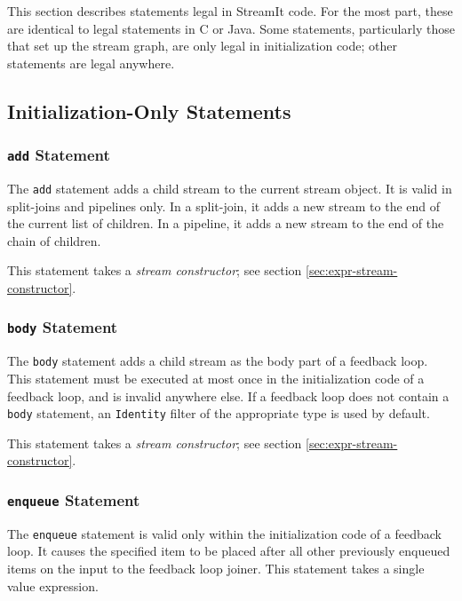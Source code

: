 \documentclass[11pt]{article}
\begin{document}
This section describes statements legal in StreamIt code.  For the
most part, these are identical to legal statements in C or Java.  Some
statements, particularly those that set up the stream graph, are only
legal in initialization code; other statements are legal anywhere.

\subsection{Initialization-Only Statements}

\subsubsection{\lstinline|add| Statement}

The \lstinline|add| statement adds a child stream to the current stream
object.  It is valid in split-joins and pipelines only.  In a
split-join, it adds a new stream to the end of the current list of
children.  In a pipeline, it adds a new stream to the end of the chain
of children.

This statement takes a \emph{stream constructor}; see section
\ref{sec:expr-stream-constructor}.

\subsubsection{\lstinline|body| Statement}

The \lstinline|body| statement adds a child stream as the body part of
a feedback loop.  This statement must be executed at most once in the
initialization code of a feedback loop, and is invalid anywhere else.
If a feedback loop does not contain a \lstinline|body| statement, an
\lstinline|Identity| filter of the appropriate type is used by
default.

This statement takes a \emph{stream constructor}; see section
\ref{sec:expr-stream-constructor}.

\subsubsection{\lstinline|enqueue| Statement}

The \lstinline|enqueue| statement is valid only within the
initialization code of a feedback loop.  It causes the specified item
to be placed after all other previously enqueued items on the input to
the feedback loop joiner.  This statement takes a single value
expression.
\end{document}
